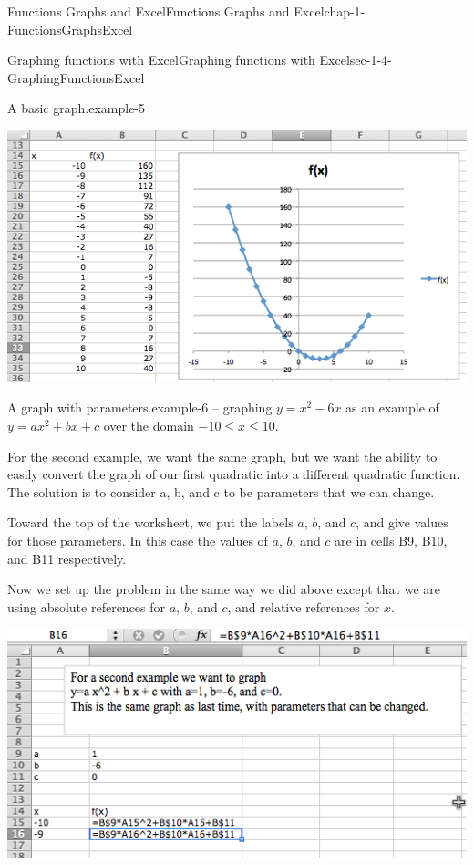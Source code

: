 \documentclass[oneside,10pt,]{book}
\numberwithin{equation}{section}
\begin{document}
\begin{chapterptx}{Functions Graphs and Excel}{}{Functions Graphs and Excel}{}{}{chap-1-FunctionsGraphsExcel}
\begin{sectionptx}{Graphing functions with Excel}{}{Graphing functions with Excel}{}{}{sec-1-4-GraphingFunctionsExcel}
\begin{example}{A basic graph.}{example-5}
\begin{sidebyside}{1}{0.1}{0.1}{0}
\begin{sbspanel}{0.8}
\includegraphics[width=1\linewidth]{images/sec1-4-4.png}
\end{sbspanel}%
\end{sidebyside}%
\end{example}
\begin{example}{A graph with parameters.}{example-6}%
\hypertarget{p-321}{}%
– graphing \(y=x^2-6 x\) as an example of \(y = a x^2 + b x + c\) over the domain \(-10 \le x \le 10\).%
\par
\hypertarget{p-322}{}%
For the second example, we want the same graph, but we want the ability to easily convert the graph of our first quadratic into a different quadratic function.  The solution is to consider a, b, and c to be parameters that we can change.%
\par
\hypertarget{p-323}{}%
Toward the top of the worksheet, we put the labels \(a\), \(b\), and \(c\), and give values for those parameters.  In this case the values of \(a\), \(b\), and \(c\) are in cells B9, B10, and B11 respectively.%
\par
\hypertarget{p-324}{}%
Now we set up the problem in the same way we did above except that we are using absolute references for \(a\), \(b\), and \(c\), and relative references for \(x\).%
\begin{sidebyside}{1}{0.1}{0.1}{0}%
\begin{sbspanel}{0.8}%
\includegraphics[width=1\linewidth]{images/sec1-4-5.png}

\end{sbspanel}
\end{sidebyside}
\end{example}
\end{sectionptx}
\end{chapterptx}
\end{document}
